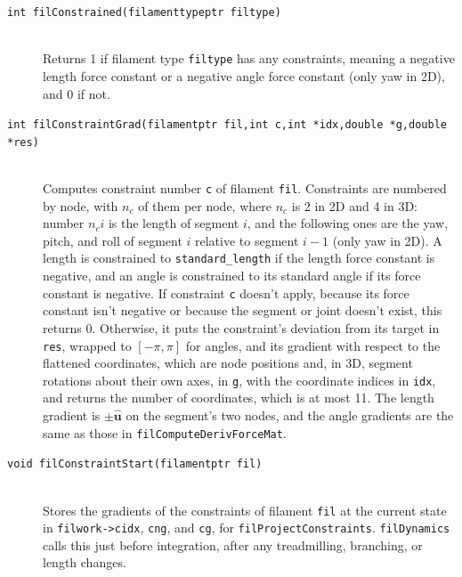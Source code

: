 \documentclass {scrbook}
\newcommand {\ttt} {\texttt}
\begin{document}
\begin{description}
\item[\ttt{int filConstrained(filamenttypeptr filtype)}]
\hfill \\
Returns 1 if filament type \ttt{filtype} has any constraints, meaning a negative length force constant or a negative angle force constant (only yaw in 2D), and 0 if not.

\item[\ttt{int filConstraintGrad(filamentptr fil,int c,int *idx,double *g,double *res)}]
\hfill \\
Computes constraint number \ttt{c} of filament \ttt{fil}. Constraints are numbered by node, with $n_c$ of them per node, where $n_c$ is 2 in 2D and 4 in 3D: number $n_c i$ is the length of segment $i$, and the following ones are the yaw, pitch, and roll of segment $i$ relative to segment $i-1$ (only yaw in 2D). A length is constrained to \ttt{standard\_length} if the length force constant is negative, and an angle is constrained to its standard angle if its force constant is negative. If constraint \ttt{c} doesn't apply, because its force constant isn't negative or because the segment or joint doesn't exist, this returns 0. Otherwise, it puts the constraint's deviation from its target in \ttt{res}, wrapped to $[-\pi,\pi]$ for angles, and its gradient with respect to the flattened coordinates, which are node positions and, in 3D, segment rotations about their own axes, in \ttt{g}, with the coordinate indices in \ttt{idx}, and returns the number of coordinates, which is at most 11. The length gradient is $\pm\hat{\bm{u}}$ on the segment's two nodes, and the angle gradients are the same as those in \ttt{filComputeDerivForceMat}.

\item[\ttt{void filConstraintStart(filamentptr fil)}]
\hfill \\
Stores the gradients of the constraints of filament \ttt{fil} at the current state in \ttt{filwork->cidx}, \ttt{cng}, and \ttt{cg}, for \ttt{filProjectConstraints}. \ttt{filDynamics} calls this just before integration, after any treadmilling, branching, or length changes.


\end{description}
\end{document}
